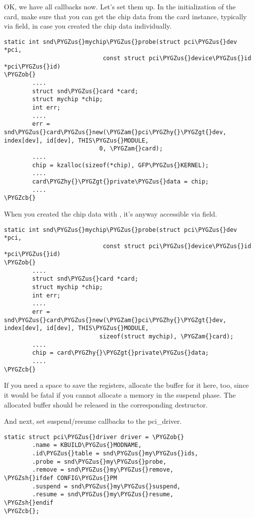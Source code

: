 \documentclass[a4paper,8pt,english]{sphinxmanual}
\def\PYGZus{\char`\_}
\def\PYGZob{\char`\{}
\def\PYGZcb{\char`\}}
\def\PYGZam{\char`\&}
\def\PYGZgt{\char`\>}
\def\PYGZsh{\char`\#}
\def\PYGZhy{\char`\-}
\begin{document}
OK, we have all callbacks now. Let's set them up. In the initialization
of the card, make sure that you can get the chip data from the card
instance, typically via  field, in case you created the
chip data individually.

\begin{Verbatim}[commandchars=\\\{\}]
static int snd\PYGZus{}mychip\PYGZus{}probe(struct pci\PYGZus{}dev *pci,
                            const struct pci\PYGZus{}device\PYGZus{}id *pci\PYGZus{}id)
\PYGZob{}
        ....
        struct snd\PYGZus{}card *card;
        struct mychip *chip;
        int err;
        ....
        err = snd\PYGZus{}card\PYGZus{}new(\PYGZam{}pci\PYGZhy{}\PYGZgt{}dev, index[dev], id[dev], THIS\PYGZus{}MODULE,
                           0, \PYGZam{}card);
        ....
        chip = kzalloc(sizeof(*chip), GFP\PYGZus{}KERNEL);
        ....
        card\PYGZhy{}\PYGZgt{}private\PYGZus{}data = chip;
        ....
\PYGZcb{}
\end{Verbatim}

When you created the chip data with , it's
anyway accessible via  field.

\begin{Verbatim}[commandchars=\\\{\}]
static int snd\PYGZus{}mychip\PYGZus{}probe(struct pci\PYGZus{}dev *pci,
                            const struct pci\PYGZus{}device\PYGZus{}id *pci\PYGZus{}id)
\PYGZob{}
        ....
        struct snd\PYGZus{}card *card;
        struct mychip *chip;
        int err;
        ....
        err = snd\PYGZus{}card\PYGZus{}new(\PYGZam{}pci\PYGZhy{}\PYGZgt{}dev, index[dev], id[dev], THIS\PYGZus{}MODULE,
                           sizeof(struct mychip), \PYGZam{}card);
        ....
        chip = card\PYGZhy{}\PYGZgt{}private\PYGZus{}data;
        ....
\PYGZcb{}
\end{Verbatim}

If you need a space to save the registers, allocate the buffer for it
here, too, since it would be fatal if you cannot allocate a memory in
the suspend phase. The allocated buffer should be released in the
corresponding destructor.

And next, set suspend/resume callbacks to the pci\_driver.

\begin{Verbatim}[commandchars=\\\{\}]
static struct pci\PYGZus{}driver driver = \PYGZob{}
        .name = KBUILD\PYGZus{}MODNAME,
        .id\PYGZus{}table = snd\PYGZus{}my\PYGZus{}ids,
        .probe = snd\PYGZus{}my\PYGZus{}probe,
        .remove = snd\PYGZus{}my\PYGZus{}remove,
\PYGZsh{}ifdef CONFIG\PYGZus{}PM
        .suspend = snd\PYGZus{}my\PYGZus{}suspend,
        .resume = snd\PYGZus{}my\PYGZus{}resume,
\PYGZsh{}endif
\PYGZcb{};
\end{Verbatim}
\end{document}
